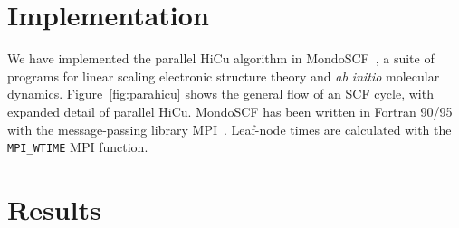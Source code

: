 \commentoutA{\documentclass[prb,aps,twocolumn,twocolumngrid]{revtex4}}
\begin{document}
\section{Implementation}
\label{sec:implementation}

We have implemented the parallel HiCu algorithm in {\sc MondoSCF}~\cite{Mondo}, a suite of
programs for linear scaling electronic structure theory and {\it ab
initio}\/ molecular dynamics.   Figure~\ref{fig:parahicu} shows the
general flow of an SCF cycle, with expanded detail of parallel HiCu.  
MondoSCF has been written in Fortran 90/95 with the message-passing library
MPI~\cite{mpi}.  Leaf-node times are calculated with the {\tt MPI\_WTIME} MPI function.

\section{Results}
\label{sec:results}
\end{document}
